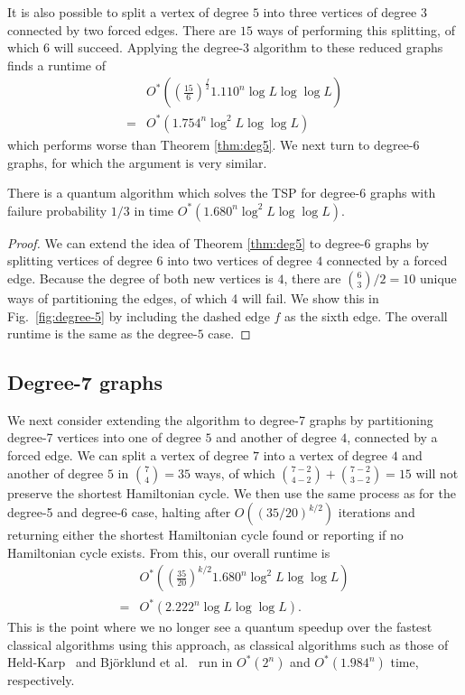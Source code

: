 %
It is also possible to split a vertex of degree $5$ into three vertices of degree $3$ connected by two forced edges. There are $15$ ways of performing this splitting, of which $6$ will succeed. Applying the degree-$3$ algorithm to these reduced graphs finds a runtime of
%
\begin{align}
&O^*\left(\left(\frac{15}{6}\right)^{\frac{f}{2}}1.110^n\log L \log \log L\right)\\
 = &O^*(1.754^n\log^2 L \log \log L)
\end{align}
%
\noindent which performs worse than Theorem \ref{thm:deg5}. We next turn to degree-6 graphs, for which the argument is very similar.

\begin{theorem}
There is a quantum algorithm which solves the TSP for degree-$6$ graphs with failure probability $1/3$ in time $O^*(1.680^n\log^2 L \log \log L)$.
\end{theorem}

\begin{proof}
We can extend the idea of Theorem \ref{thm:deg5} to degree-6 graphs by splitting vertices of degree $6$ into two vertices of degree $4$ connected by a forced edge. Because the degree of both new vertices is $4$, there are $\binom{6}{3}/2 = 10$ unique ways of partitioning the edges, of which 4 will fail. We show this in Fig.\ \ref{fig:degree-5} by including the dashed edge $f$ as the sixth edge. The overall runtime is the same as the degree-$5$ case.
\end{proof}

\subsection{Degree-7 graphs}

We next consider extending the algorithm to degree-7 graphs by partitioning degree-7 vertices into one of degree $5$ and another of degree $4$, connected by a forced edge. We can split a vertex of degree $7$ into a vertex of degree $4$ and another of degree $5$ in $\binom{7}{4} = 35$ ways, of which $\binom{7-2}{4-2} + \binom{7-2}{3-2} = 15$ will not preserve the shortest Hamiltonian cycle. We then use the same process as for the degree-5 and degree-6 case, halting after $O((35/20)^{k/2})$ iterations and returning either the shortest Hamiltonian cycle found or reporting if no Hamiltonian cycle exists. From this, our overall runtime is
%
\begin{align}
&O^*\left(\left(\frac{35}{20}\right)^{k/2}1.680^n\log^2 L \log \log L\right)\\
=&O^*(2.222^n\log L \log \log L).
\end{align}
%
This is the point where we no longer see a quantum speedup over the fastest classical algorithms using this approach, as classical algorithms such as those of Held-Karp~\cite{held1962} and Bj{\"o}rklund et al.~\cite{bjorklund2008} run in $O^*(2^n)$ and $O^*(1.984^n)$ time, respectively.

